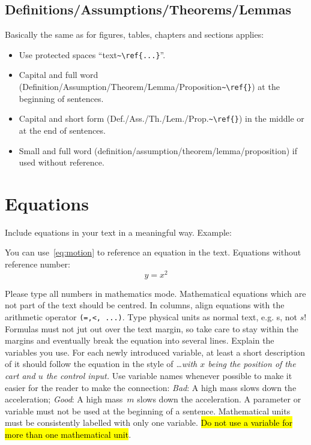 \subsection{Definitions/Assumptions/Theorems/Lemmas}

Basically the same as for figures, tables, chapters and sections applies:
\begin{itemize}
	\item Use protected spaces ``text\verb|~\ref{...}|''.
	\item Capital and full word (Definition/Assumption/Theorem/Lemma/Proposition\verb|~\ref{}|) at the beginning of sentences.
	\item Capital and short form (Def./Ass./Th./Lem./Prop.\verb|~\ref{}|) in the middle or at the end of sentences.
	\item Small and full word (definition/assumption/theorem/lemma/proposition) if used without reference.
\end{itemize}

\section{Equations}
Include equations in your text in a meaningful way. Example: 

\vspace{\baselineskip}

\vspace{\baselineskip}

You can use~\eqref{eq:motion} to reference an equation in the
text. Equations without reference number:
\[
y=x^2
\]



Please type all numbers in mathematics mode.
Mathematical equations which are not part of the text should be centred. In columns, align equations with the arithmetic operator \verb|(=,<, ...)|.
Type physical units as normal text, e.g. s, not $s$!
Formulas must not jut out over the text margin, so take care to stay within the margins and eventually break the equation into several lines.
Explain the variables you use. For each newly introduced variable, at least a short description of it should follow the equation in the style of \emph{\ldots with $x$ being the position of the cart and $u$ the control input.} Use variable names whenever possible to make it easier for the reader to make the connection: \emph{Bad}: A high mass slows down the acceleration; \emph{Good}: A high mass~$m$ slows down the acceleration.
A parameter or variable must not be used at the beginning of a sentence.
Mathematical units must be consistently labelled with only one variable. \hl{Do not
use a variable for more than one mathematical unit}.

